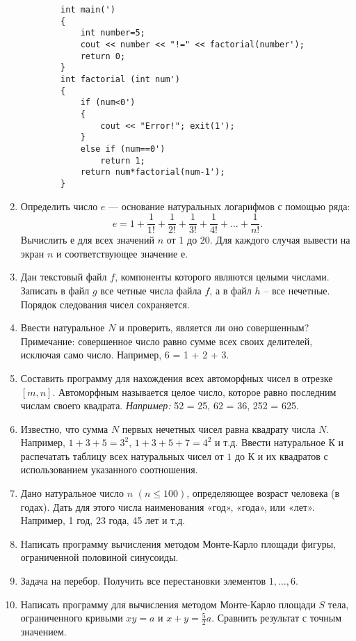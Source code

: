 \begin{enumerate}[leftmargin=*]
\begin{lstlisting}
        int main(')
        {
            int number=5;
            cout << number << "!=" << factorial(number');
            return 0;
        }
        int factorial (int num')
        {
            if (num<0')
            {
                cout << "Error!"; exit(1');
            }
            else if (num==0')
                return 1;
            return num*factorial(num-1');
        }
    \end{lstlisting}
    \item Определить число $e$ --- основание натуральных логарифмов с помощью ряда:
    \begin{equation*}
        e=1+\frac{1}{1!}+\frac{1}{2!}+\frac{1}{3!}+\frac{1}{4!}+\dots+\frac{1}{n!} .
    \end{equation*}
    Вычислить $е$ для всех значений $n$ от 1 до 20. Для каждого случая вывести на экран $n$ и соответствующее значение $е$.
    \item Дан текстовый файл $f$, компоненты которого являются целыми числами. Записать в файл $g$ все четные числа файла $f$, а в файл $h$ – все нечетные. Порядок следования чисел сохраняется.
    \item Ввести натуральное $N$ и проверить, является ли оно совершенным? Примечание: совершенное число равно сумме всех своих делителей, исключая само число. Например, 6 = 1 + 2 + 3.
    \item Составить программу для нахождения всех автоморфных чисел в отрезке $[m, n]$. Автоморфным называется целое число, которое равно последним числам своего квадрата. 
    \textit{Например:} 52 = 25, 62 = 36, 252 = 625.
    \item Известно, что сумма $N$ первых нечетных чисел равна квадрату числа $N$. Например, $1+3+5=3^2$, $1+3+5+7=4^2$ и т.д. Ввести натуральное К и распечатать таблицу всех натуральных чисел от $1$ до $К$ и их квадратов с использованием указанного соотношения.
    \item Дано натуральное число $n$ $(n≤100)$, определяющее возраст человека (в годах). Дать для этого числа наименования «год», «года», или «лет». Например, 1 год, 23 года, 45 лет и т.д.
    \item Написать программу вычисления методом Монте-Карло площади фигуры, ограниченной половиной синусоиды.
    \item Задача на перебор. Получить все перестановки элементов $1, … , 6$.
    \item Написать программу для вычисления методом Монте-Карло площади $S$ тела, ограниченного кривыми $xy=a$ и $x+y=\frac{5}{2}a$. Сравнить результат с точным значением.

\end{enumerate}
